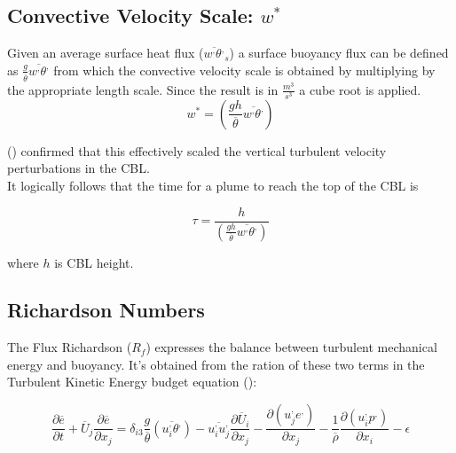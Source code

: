 \subsection{Convective Velocity Scale: $w^{*}$}
Given an average surface heat flux ($\overline{w^{,}\theta^{,}}_{s}$) a surface buoyancy flux can be defined as 
$\frac{g}{\overline{\theta}}\overline{w^{,}\theta^{,}}$ from which the convective velocity scale is obtained by
multiplying by the appropriate length scale.  Since the result is in $\frac{m^{3}}{s^{3}}$ a cube root is applied.\\

\begin{equation}
w^{*} = \left( \frac{gh}{\overline{\theta}}\overline{w^{,}\theta^{,}} \right)
\end{equation}

\citeauthor{Deardorff70} (\cite{Deardorff70}) confirmed that this effectively scaled the vertical turbulent velocity
perturbations in the \acs{CBL}.\\

It logically follows that the time for a plume to reach the top of the \acs{CBL} is

\begin{equation}
\tau = \frac{h}{\left( \frac{gh}{\overline{\theta}}\overline{w^{,}\theta^{,}} \right)}
\end{equation}

where $h$ is \acs{CBL} height.

\subsection{Richardson Numbers}

The Flux Richardson ($R_{f}$) expresses the balance between turbulent mechanical energy and buoyancy.  It's obtained from the ration of these two terms
 in the Turbulent Kinetic Energy budget equation (\cite{Stull-BLMetIntro}):

\begin{equation}
\frac{\partial \overline{e}}{\partial t} + \overline{U}_{j} \frac{\partial \overline{e}}{\partial x_{j}} = \delta_{i3}  \frac{g}{\overline{\theta}} \left( \overline{u_{i}^{,}\theta^{,}} \right) - \overline{u_{i}^{,}u_{j}^{,}}\frac{\partial \overline{U}_{i}}{\partial x_{j}} - \frac{ \partial \left( u_{j}^{,}e^{,} \right)}{\partial x_{j}} - \frac{1}{\overline{\rho}} \frac{\partial \left( u_{i}^{,} p^{,} \right) }{\partial x_{i}} - \epsilon
\end{equation}

